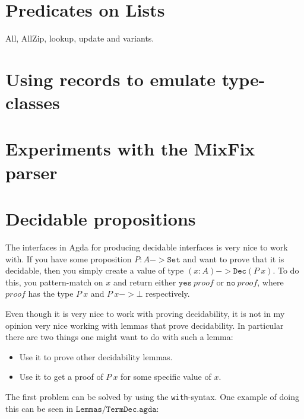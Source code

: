 \section{Predicates on Lists}
All, AllZip, lookup, update and variants.

\section{Using records to emulate type-classes}

\section{Experiments with the MixFix parser}

\section{Decidable propositions}

The interfaces in Agda for producing decidable interfaces is very nice to work
with. If you have some proposition $P : A -> \mathtt{Set}$ and want to prove
that it is decidable, then you simply create a value of type
$(x : A) -> \mathtt{Dec} (P\ x)$. To do this, you pattern-match on $x$ and
return either $\mathtt{yes}\ proof$ or $\mathtt{no}\ proof$, where $proof$ has
the type $P\ x$ and $P\ x -> \bot$ respectively.

Even though it is very nice to work with proving decidability, it is not in my
opinion very nice working with lemmas that prove decidability. In particular
there are two things one might want to do with such a lemma:

\begin{itemize}
\item Use it to prove other decidability lemmas.
\item Use it to get a proof of $P\ x$ for some specific value of $x$.
\end{itemize}

The first problem can be solved by using the \texttt{with}-syntax. One example
of doing this can be seen in $\texttt{Lemmas/TermDec.agda}$:

